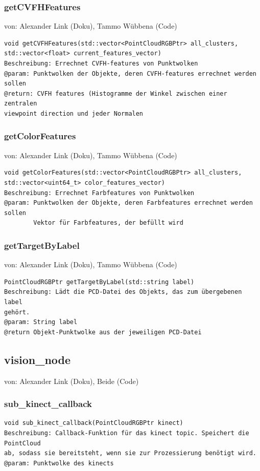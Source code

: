 \documentclass{suturo}
\makeatletter
\newcommand{\chapterauthor}[1]{%
  {\parindent0pt\vspace*{-27pt}%
  \linespread{0}\small\begin{flushright}von: #1\end{flushright}%
  \par\nobreak\vspace*{0pt}}
  \@afterheading%
}
\makeatother
\begin{document}
\subsubsection{getCVFHFeatures}
\chapterauthor{Alexander Link (Doku), Tammo Wübbena (Code)}
\begin{verbatim}
void getCVFHFeatures(std::vector<PointCloudRGBPtr> all_clusters,
std::vector<float> current_features_vector)
Beschreibung: Errechnet CVFH-features von Punktwolken
@param: Punktwolken der Objekte, deren CVFH-features errechnet werden sollen
@return: CVFH features (Histogramme der Winkel zwischen einer zentralen
viewpoint direction und jeder Normalen
\end{verbatim}\label{func:getcvfhfeatures}

\subsubsection{getColorFeatures}
\chapterauthor{Alexander Link (Doku), Tammo Wübbena (Code)}
\begin{verbatim}
void getColorFeatures(std::vector<PointCloudRGBPtr> all_clusters,
std::vector<uint64_t> color_features_vector)
Beschreibung: Errechnet Farbfeatures von Punktwolken
@param: Punktwolken der Objekte, deren Farbfeatures errechnet werden sollen
	    Vektor für Farbfeatures, der befüllt wird
\end{verbatim}\label{func:getcolorfeatures}

\subsubsection{getTargetByLabel}
\chapterauthor{Alexander Link (Doku), Tammo Wübbena (Code)}
\begin{verbatim}
PointCloudRGBPtr getTargetByLabel(std::string label)
Beschreibung: Lädt die PCD-Datei des Objekts, das zum übergebenen label
gehört.
@param: String label
@return Objekt-Punktwolke aus der jeweiligen PCD-Datei
\end{verbatim}\label{func:gettargetbylabel}


\subsection*{vision\_node}
\chapterauthor{Alexander Link (Doku), Beide (Code)}
\subsubsection{sub\_kinect\_callback}
\begin{verbatim}
void sub_kinect_callback(PointCloudRGBPtr kinect)
Beschreibung: Callback-Funktion für das kinect topic. Speichert die PointCloud
ab, sodass sie bereitsteht, wenn sie zur Prozessierung benötigt wird.
@param: Punktwolke des kinects
\end{verbatim}\label{func:subkinectcallback}
\end{document}
